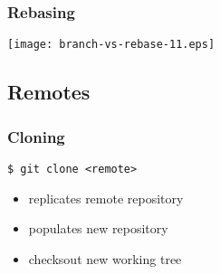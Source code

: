 \documentclass[english]{beamer}
\newcommand{\mysubsection}[2]{%
  \hypertarget{#2}{}%
  \subsection{#1}%
  \label{#2}%
}
\newcommand{\CMD}[1]{%
\texttt{\textcolor{code-green}{#1}}%
}
\newcommand{\green}[1]{%
\textcolor{code-green}{#1}%
}
\begin{document}
\begin{frame}
\frametitle{Rebasing}

\texttt{[image: branch-vs-rebase-11.eps]}
\vspace{\textheight}
\end{frame}

\mysubsection{Remotes}{using:remotes}

\begin{frame}
\frametitle{Cloning}

\CMD{\$ git clone <remote>} \\
\begin{itemize}
        \item replicates \green{remote} repository
        \item populates new repository
        \item checksout new working tree
\end{itemize}
\end{frame}
\end{document}
